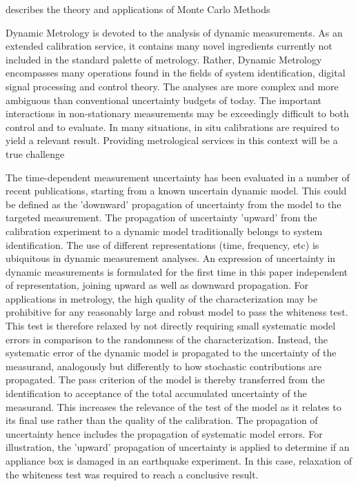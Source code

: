 \documentclass[11pt]{article}
\begin{document}
\citet{Hammersley75} describes the theory and applications of  Monte Carlo Methods

\citet{Hessling10} Dynamic Metrology is devoted to the analysis of dynamic measurements.  As  an  extended  calibration  service,  it  contains  many  novel  ingredients currently not included in the standard palette of metrology. Rather, Dynamic Metrology encompasses many operations found in the fields of system identification, digital signal processing and control theory. The analyses are more complex and more ambiguous than conventional uncertainty budgets of today. The important interactions in non-stationary measurements  may  be  exceedingly  difficult  to  both  control  and  to  evaluate.  In  many situations, in situ calibrations are required to yield a relevant result. Providing metrological services in this context will be a true challenge

\citet{Hessling11} The time-dependent measurement uncertainty has been evaluated in a number of recent publications, starting from a known uncertain dynamic model. This could be defined as the 'downward' propagation of uncertainty from the model to the targeted measurement. The propagation of uncertainty 'upward' from the calibration experiment to a dynamic model traditionally belongs to system identification. The use of different representations (time, frequency, etc) is ubiquitous in dynamic measurement analyses. An expression of uncertainty in dynamic measurements is formulated for the first time in this paper independent of representation, joining upward as well as downward propagation. For applications in metrology, the high quality of the characterization may be prohibitive for any reasonably large and robust model to pass the whiteness test. This test is therefore relaxed by not directly requiring small systematic model errors in comparison to the randomness of the characterization. Instead, the systematic error of the dynamic model is propagated to the uncertainty of the measurand, analogously but differently to how stochastic contributions are propagated. The pass criterion of the model is thereby transferred from the identification to acceptance of the total accumulated uncertainty of the measurand. This increases the relevance of the test of the model as it relates to its final use rather than the quality of the calibration. The propagation of uncertainty hence includes the propagation of systematic model errors. For illustration, the 'upward' propagation of uncertainty is applied to determine if an appliance box is damaged in an earthquake experiment. In this case, relaxation of the whiteness test was required to reach a conclusive result.
\end{document}
